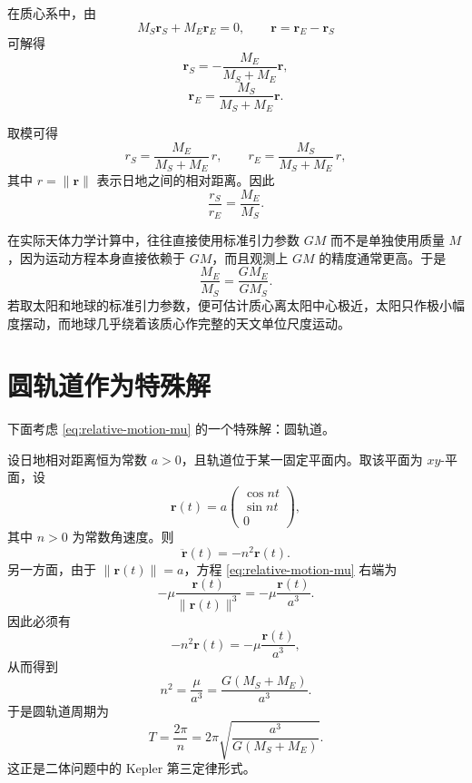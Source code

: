 在质心系中，由
\[
M_S \bm r_S + M_E \bm r_E = 0,
\qquad
\bm r = \bm r_E-\bm r_S
\]
可解得
\begin{equation}\label{eq:rs-bary}
\bm r_S=-\frac{M_E}{M_S+M_E}\bm r,
\end{equation}
\begin{equation}\label{eq:re-bary}
\bm r_E=\frac{M_S}{M_S+M_E}\bm r.
\end{equation}

取模可得
\[
r_S=\frac{M_E}{M_S+M_E}\,r,
\qquad
r_E=\frac{M_S}{M_S+M_E}\,r,
\]
其中 \(r=\|\bm r\|\) 表示日地之间的相对距离。因此
\[
\frac{r_S}{r_E}=\frac{M_E}{M_S}.
\]

在实际天体力学计算中，往往直接使用标准引力参数 \(GM\) 而不是单独使用质量 \(M\)\cite{JPLAstroParameters}，因为运动方程本身直接依赖于 \(GM\)，而且观测上 \(GM\) 的精度通常更高。于是
\[
\frac{M_E}{M_S}=\frac{GM_E}{GM_S}.
\]
若取太阳和地球的标准引力参数，便可估计质心离太阳中心极近，太阳只作极小幅度摆动，而地球几乎绕着该质心作完整的天文单位尺度运动。

\section{圆轨道作为特殊解}

下面考虑 \eqref{eq:relative-motion-mu} 的一个特殊解：圆轨道。

设日地相对距离恒为常数 \(a>0\)，且轨道位于某一固定平面内。取该平面为 \(xy\)-平面，设
\begin{equation}\label{eq:circular-ansatz}
\bm r(t)
=
a
\begin{pmatrix}
\cos nt\\
\sin nt\\
0
\end{pmatrix},
\end{equation}
其中 \(n>0\) 为常数角速度。则
\[
\ddot{\bm r}(t)=-n^2\bm r(t).
\]
另一方面，由于 \(\|\bm r(t)\|=a\)，方程 \eqref{eq:relative-motion-mu} 右端为
\[
-\mu \frac{\bm r(t)}{\|\bm r(t)\|^3}=-\mu \frac{\bm r(t)}{a^3}.
\]
因此必须有
\[
-n^2\bm r(t)=-\mu \frac{\bm r(t)}{a^3},
\]
从而得到
\begin{equation}\label{eq:n2}
n^2=\frac{\mu}{a^3}=\frac{G(M_S+M_E)}{a^3}.
\end{equation}
于是圆轨道周期为
\begin{equation}\label{eq:period}
T=\frac{2\pi}{n}=2\pi \sqrt{\frac{a^3}{G(M_S+M_E)}}.
\end{equation}
这正是二体问题中的 Kepler 第三定律形式\cite{MurrayDermott1999,BateMuellerWhite1971}。


